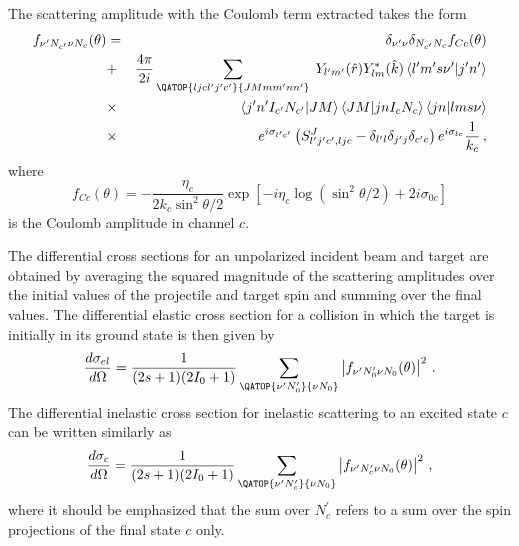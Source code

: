 The scattering amplitude with the Coulomb term extracted takes the form 
\begin{eqnarray}
f_{\nu^{\prime}N_{c^{\prime}}\nu N_{c}}(\theta) & = &
\delta_{\nu^{\prime}\nu}\delta_{N_{c^{\prime}}N_{c}}f_{Cc}(\theta) \\
& + & \frac{4\pi}{2i}\sum_{{{\QATOP{ljcl^{\prime}j^{\prime}c^{\prime}}{%
JMmm^{\prime}nn^{\prime}}}}}\; Y_{l^{\prime}m^{\prime}}(\hat{r})Y_{lm}^{*}(%
\hat{k})\left\langle
l^{\prime}m^{\prime}s\nu^{\prime}|j^{\prime}n^{\prime}\right\rangle  \notag
\\
& \times &\left\langle
j^{\prime}n^{\prime}I_{c^{\prime}}N_{c^{\prime}}|JM\right\rangle
\left\langle JM|jnI_{c}N_{c}\right\rangle \left\langle jn|lms\nu\right\rangle
\notag \\
&\times &
e^{i\sigma_{l^{\prime}c^{\prime}}}\left(S_{l^{\prime}j^{\prime}c^{%
\prime},ljc}^{J}-\delta_{l^{\prime}l}\delta_{j^{\prime}j}\delta_{c^{%
\prime}c}\right)e^{i\sigma_{lc}}\frac{1}{k_{c}}\,,  \notag
\end{eqnarray}
where 
\begin{equation}
f_{Cc}(\theta)=-\frac{\eta_{c}}{2k_{c}\sin^{2}\theta/2}\exp\left[%
-i\eta_{c}\log\left(\sin^{2}\theta/2\right)+2i\sigma_{0c}\right]
\end{equation}
is the Coulomb amplitude in channel $c$.

The differential cross sections for an unpolarized incident beam and target
are obtained by averaging the squared magnitude of the scattering amplitudes
over the initial values of the projectile and target spin and summing over
the final values. The differential elastic cross section for a collision in
which the target is initially in its ground state is then given by 
\begin{equation}
\frac{d\sigma_{el}}{d\Omega}=\frac{1}{(2s+1)(2I_{0}+1)}\sum_{{{\QATOP{%
\nu^{\prime}N_{0}^{\prime}}{\nu N_{0}}}}}\left|f_{\nu^{\prime}N_{0}^{\prime}%
\nu N_{0}}(\theta)\right|^{2}\,.  \label{celf}
\end{equation}
The differential inelastic cross section for inelastic scattering to an
excited state $c$ can be written similarly as 
\begin{equation}
\frac{d\sigma_{c}}{d\Omega}=\frac{1}{(2s+1)(2I_{0}+1)}\sum_{{{\QATOP{%
\nu^{\prime}N_{c}^{\prime}}{\nu N_{0}}}}}\left|f_{\nu^{\prime}N_{c}^{\prime}%
\nu N_{0}}(\theta)\right|^{2}\,,
\end{equation}
where it should be emphasized that the sum over $N_{c}^{\prime}$ refers to a
sum over the spin projections of the final state $c$ only.

